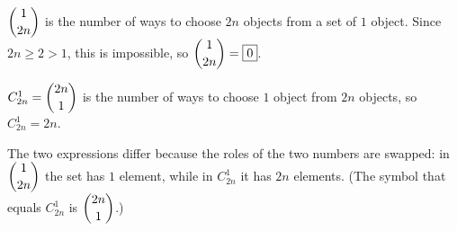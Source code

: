 $\dbinom{1}{2n}$ is the number of ways to choose $2n$ objects from a set of $1$ object. Since $2n\ge2>1$, this is impossible, so $\dbinom1{2n}=\boxed{0}$.

$C_{2n}^1=\dbinom{2n}{1}$ is the number of ways to choose $1$ object from $2n$ objects, so $C_{2n}^1=\boxed{2n}$.

The two expressions differ because the roles of the two numbers are swapped: in $\dbinom{1}{2n}$ the set has $1$ element, while in $C_{2n}^1$ it has $2n$ elements. (The symbol that equals $C_{2n}^1$ is $\dbinom{2n}{1}$.)

